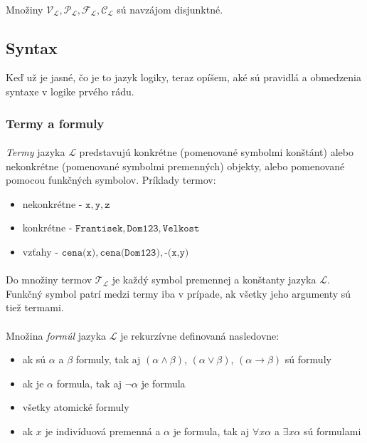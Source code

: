 \paragraph{}
Množiny $\mathcal{V}_\mathcal{L}, \mathcal{P}_\mathcal{L}, \mathcal{F}_\mathcal{L}, \mathcal{C}_\mathcal{L}$ sú navzájom disjunktné.



\subsection{Syntax}
Keď už je jasné, čo je to jazyk logiky, teraz opíšem, aké sú pravidlá a obmedzenia syntaxe v logike prvého rádu. 

\subsubsection{Termy a formuly}
\paragraph{}
\emph{Termy} jazyka $\mathcal{L}$ predstavujú konkrétne (pomenované symbolmi konštánt) alebo nekonkrétne (pomenované symbolmi premenných) objekty, alebo pomenované pomocou funkčných symbolov. Príklady termov:
\begin{itemize}
	\item nekonkrétne - $\texttt{x}, \texttt{y}, \texttt{z}$
	\item konkrétne - $\texttt{Frantisek}, \texttt{Dom123}, \texttt{Velkost}$
	\item vzťahy - $\texttt{cena(x)}, \texttt{cena(Dom123)}, \texttt{-(x,y)}$
\end{itemize}
\paragraph{}
Do množiny termov $\mathcal{T}_\mathcal{L}$ je každý symbol premennej a konštanty jazyka $\mathcal{L}$. Funkčný symbol patrí medzi termy iba v prípade, ak všetky jeho argumenty sú tiež termami.
\paragraph{}
Množina \emph{formúl} jazyka $\mathcal{L}$ je rekurzívne definovaná nasledovne:
\begin{itemize}
    \item ak sú $\alpha$ a $\beta$ formuly, tak aj $(\alpha \wedge \beta)$, $(\alpha \vee \beta)$, $(\alpha \to \beta)$ sú formuly
    \item ak je $\alpha$ formula, tak aj $\neg \alpha$ je formula
    \item všetky atomické formuly
    \item ak $x$ je indivíduová premenná a $\alpha$ je formula, tak aj $\forall x \alpha$ a $\exists x \alpha$ sú formulami
\end{itemize}

